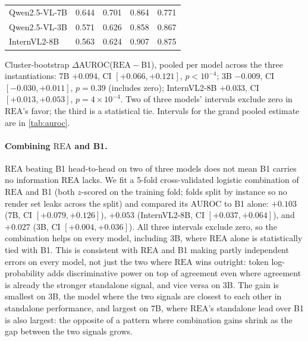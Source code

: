 \documentclass[11pt]{article}
\newcommand{\rea}{\mathrm{REA}}
\newcommand{\rmg}{\mathrm{RM}}
\begin{document}
\begin{center}
\footnotesize
\setlength{\tabcolsep}{4pt}
\begin{tabular}{@{}l S[table-format=1.3] S[table-format=1.3] S[table-format=1.3] S[table-format=1.3]@{}}
\toprule
{} & {} & {\kilth{$\rmg$}} & {\kilth{$\rea$}} & {} \\
\midrule
Qwen2.5-VL-7B  & 0.644 & 0.701 & 0.864 & 0.771 \\
Qwen2.5-VL-3B  & 0.571 & 0.626 & 0.858 & 0.867 \\
InternVL2-8B   & 0.563 & 0.624 & 0.907 & 0.875 \\
\bottomrule
\end{tabular}
\end{center}

\noindent Cluster-bootstrap $\Delta$AUROC($\rea-$B1), pooled per model across the three instantiations: 7B $+0.094$, CI $[+0.066,+0.121]$, $p<10^{-4}$; 3B $-0.009$, CI $[-0.030,+0.011]$, $p{=}0.39$ (includes zero); InternVL2-8B $+0.033$, CI $[+0.013,+0.053]$, $p{=}4{\times}10^{-4}$. Two of three models' intervals exclude zero in $\rea$'s favor; the third is a statistical tie. Intervals for the grand pooled estimate are in \cref{tab:auroc}.

\paragraph{Combining $\rea$ and B1.} $\rea$ beating B1 head-to-head on two of three models does not mean B1 carries no information $\rea$ lacks. We fit a 5-fold cross-validated logistic combination of $\rea$ and B1 (both $z$-scored on the training fold; folds split by instance so no render set leaks across the split) and compared its AUROC to B1 alone: $+0.103$ (7B, CI $[+0.079,+0.126]$), $+0.053$ (InternVL2-8B, CI $[+0.037,+0.064]$), and $+0.027$ (3B, CI $[+0.004,+0.036]$). All three intervals exclude zero, so the combination helps on every model, including 3B, where $\rea$ alone is statistically tied with B1. This is consistent with $\rea$ and B1 making partly independent errors on every model, not just the two where $\rea$ wins outright: token log-probability adds discriminative power on top of agreement even where agreement is already the stronger standalone signal, and vice versa on 3B. The gain is smallest on 3B, the model where the two signals are closest to each other in standalone performance, and largest on 7B, where $\rea$'s standalone lead over B1 is also largest: the opposite of a pattern where combination gains shrink as the gap between the two signals grows.
\end{document}

